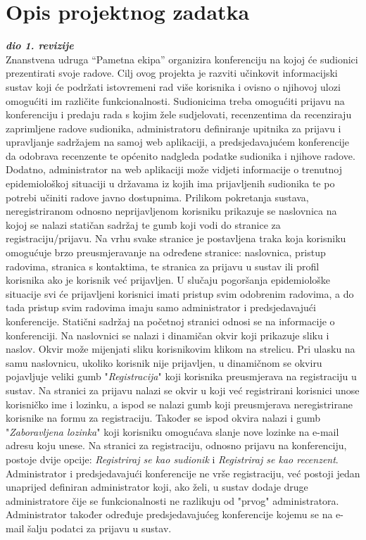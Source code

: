 \chapter{Opis projektnog zadatka}
		
		\textbf{\textit{dio 1. revizije}}\\

		Znanstvena udruga “Pametna ekipa” organizira konferenciju na kojoj će sudionici prezentirati svoje radove. Cilj ovog projekta je razviti učinkovit informacijski sustav koji će podržati istovremeni rad više korisnika i ovisno o njihovoj ulozi omogućiti im različite funkcionalnosti. Sudionicima treba omogućiti prijavu na konferenciju i predaju rada s kojim žele sudjelovati, recenzentima da recenziraju zaprimljene radove sudionika, administratoru definiranje upitnika za prijavu i upravljanje sadržajem na samoj web aplikaciji, a predsjedavajućem konferencije da odobrava recenzente te općenito nadgleda podatke sudionika i njihove radove. Dodatno, administrator na web aplikaciji može vidjeti informacije o trenutnoj epidemiološkoj situaciji u državama iz kojih ima prijavljenih sudionika te po potrebi učiniti radove javno dostupnima.
		\newline
		\newline
		Prilikom pokretanja sustava, neregistriranom odnosno neprijavljenom korisniku prikazuje se naslovnica na kojoj se nalazi statičan sadržaj te gumb koji vodi do stranice za registraciju/prijavu. Na vrhu svake stranice  je postavljena traka koja korisniku omogućuje brzo preusmjeravanje na određene stranice: naslovnica, pristup radovima, stranica s kontaktima, te stranica za prijavu u sustav ili profil korisnika ako je korisnik već prijavljen. U slučaju pogoršanja epidemiološke situacije svi će prijavljeni korisnici imati pristup svim odobrenim radovima, a do tada pristup svim radovima imaju samo administrator i predsjedavajući konferencije. Statični sadržaj na početnoj stranici odnosi se na informacije o konferenciji. Na naslovnici se nalazi i dinamičan okvir koji prikazuje sliku i naslov. Okvir može mijenjati sliku korisnikovim klikom na strelicu. Pri ulasku na samu naslovnicu, ukoliko korisnik nije prijavljen, u dinamičnom se okviru pojavljuje veliki gumb "\textit{Registracija}" koji korisnika preusmjerava na registraciju u sustav. 
		\newline
		\newline
		Na stranici za prijavu nalazi se okvir u koji već registrirani korisnici unose korisničko ime i lozinku, a ispod se nalazi gumb koji preusmjerava neregistrirane korisnike na formu za registraciju. Također se ispod okvira nalazi i gumb "\textit{Zaboravljena lozinka}" koji korisniku omogućava slanje nove lozinke na e-mail adresu koju unese. Na stranici za registraciju, odnosno prijavu na konferenciju, postoje dvije opcije: \textit{Registriraj se kao sudionik} i \textit{Registriraj se kao recenzent}. Administrator i predsjedavajući konferencije ne vrše registraciju, već postoji jedan unaprijed definiran administrator koji, ako želi, u sustav dodaje druge administratore čije se funkcionalnosti ne razlikuju od "prvog" administratora. Administrator također određuje predsjedavajućeg konferencije kojemu se na e-mail šalju podatci za prijavu u sustav.
